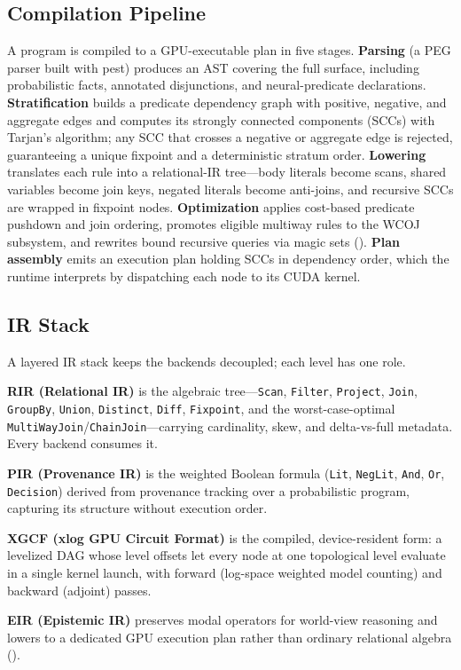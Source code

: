 \subsection{Compilation Pipeline}

A program is compiled to a GPU-executable plan in five stages. \textbf{Parsing} (a PEG parser built with pest) produces an AST covering the full surface, including probabilistic facts, annotated disjunctions, and neural-predicate declarations. \textbf{Stratification} builds a predicate dependency graph with positive, negative, and aggregate edges and computes its strongly connected components (SCCs) with Tarjan's algorithm; any SCC that crosses a negative or aggregate edge is rejected, guaranteeing a unique fixpoint and a deterministic stratum order. \textbf{Lowering} translates each rule into a relational-IR tree---body literals become scans, shared variables become join keys, negated literals become anti-joins, and recursive SCCs are wrapped in fixpoint nodes. \textbf{Optimization} applies cost-based predicate pushdown and join ordering, promotes eligible multiway rules to the WCOJ subsystem, and rewrites bound recursive queries via magic sets (). \textbf{Plan assembly} emits an execution plan holding SCCs in dependency order, which the runtime interprets by dispatching each node to its CUDA kernel.

\subsection{IR Stack}

A layered IR stack keeps the backends decoupled; each level has one role.

\textbf{RIR (Relational IR)} is the algebraic tree---\texttt{Scan}, \texttt{Filter}, \texttt{Project}, \texttt{Join}, \texttt{GroupBy}, \texttt{Union}, \texttt{Distinct}, \texttt{Diff}, \texttt{Fixpoint}, and the worst-case-optimal \texttt{MultiWayJoin}/\texttt{ChainJoin}---carrying cardinality, skew, and delta-vs-full metadata. Every backend consumes it.

\textbf{PIR (Provenance IR)} is the weighted Boolean formula (\texttt{Lit}, \texttt{NegLit}, \texttt{And}, \texttt{Or}, \texttt{Decision}) derived from provenance tracking over a probabilistic program, capturing its structure without execution order.

\textbf{XGCF (xlog GPU Circuit Format)} is the compiled, device-resident form: a levelized DAG whose level offsets let every node at one topological level evaluate in a single kernel launch, with forward (log-space weighted model counting) and backward (adjoint) passes.

\textbf{EIR (Epistemic IR)} preserves modal operators for world-view reasoning and lowers to a dedicated GPU execution plan rather than ordinary relational algebra ().
